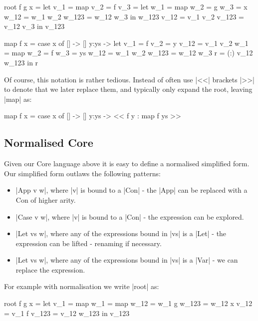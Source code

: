 \documentclass{sigplanconf}
\begin{document}
\begin{code}
root f g x =
    let v_1 = map
        v_2 = f
        v_3 = let w_1 = map
                  w_2 = g
                  w_3 = x
                  w_12 = w_1 w_2
                  w_123 = w_12 w_3
              in w_123
        v_12 = v_1 v_2
        v_123 = v_12 v_3
    in v_123

map f x = case x of
    [] -> []
    y:ys -> let v_1 = f
                v_2 = y
                v_12 = v_1 v_2
                w_1 = map
                w_2 = f
                w_3 = ys
                w_12 = w_1 w_2
                w_123 = w_12 w_3
                r = (:) v_12 w_123
            in r
\end{code}

Of course, this notation is rather tedious. Instead of often use |<<| brackets |>>| to denote that we later replace them, and typically only expand the root, leaving |map| as:

\begin{code}
map f x = case x of
    [] -> []
    y:ys -> << f y : map f ys >>
\end{code}


\subsection{Normalised Core}

Given our Core language above it is easy to define a normalised simplified form. Our simplified form outlaws the following patterns:

\begin{itemize}
\item |App v w|, where |v| is bound to a |Con| - the |App| can be replaced with a Con of higher arity.
\item |Case v w|, where |v| is bound to a |Con| - the expression can be explored.
\item |Let vs w|, where any of the expressions bound in |vs| is a |Let| - the expression can be lifted - renaming if necessary.
\item |Let vs w|, where any of the expressions bound in |vs| is a |Var| - we can replace the expression.
\end{itemize}

For example with normalisation we write |root| as:

\begin{code}
root f g x =
    let v_1 = map
        w_1 = map
        w_12 = w_1 g
        w_123 = w_12 x
        v_12 = v_1 f
        v_123 = v_12 w_123
    in v_123
\end{code}
\end{document}
